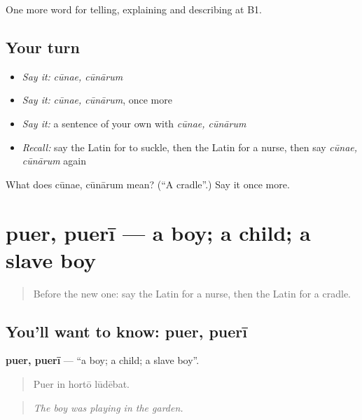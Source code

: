 \begin{grammarlens}[title={What you've built}]
One more word for telling, explaining and describing at B1.
\end{grammarlens}

\subsection*{Your turn}
\begin{itemize}
\raggedright
  \item \emph{Say it:} \emph{cūnae, cūnārum}
  \item \emph{Say it:} \emph{cūnae, cūnārum}, once more
  \item \emph{Say it:} a sentence of your own with \emph{cūnae, cūnārum}
  \item \emph{Recall:} say the Latin for to suckle, then the Latin for a nurse, then say \emph{cūnae, cūnārum} again
\end{itemize}

\begin{tcolorbox}[breakable,colback=teal!4,colframe=teal!35!black,title={Before you move on}]
What does cūnae, cūnārum mean? (\textquotedblleft{}A cradle\textquotedblright{}.) Say it once more.
\end{tcolorbox}
\section[puer, puerī]{puer, puerī — a boy; a child; a slave boy}

\label{lesson:LA-C324-puer}



\begin{quote}
Before the new one: say the Latin for a nurse, then the Latin for a cradle.
\end{quote}

\subsection*{You'll want to know: puer, puerī}
\textbf{puer, puerī} — \textquotedblleft{}a boy; a child; a slave boy\textquotedblright{}.

\begin{quote}
Puer in hortō lūdēbat.
\end{quote}

\begin{quote}
\emph{The boy was playing in the garden.}
\end{quote}

